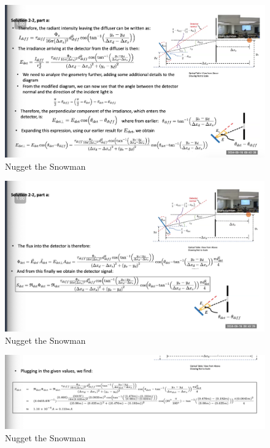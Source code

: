 \documentclass{article}
\begin{document}
\begin{figure}[h!]
\centering
\includegraphics[scale=.6]{Radiometry/Week4/Notes/PSET2/P2a.png}
\caption{Nugget the Snowman}
\label{fig:P2a}
\end{figure}


\begin{figure}[h!]
\centering
\includegraphics[scale=.6]{Radiometry/Week4/Notes/PSET2/P2aa.png}
\caption{Nugget the Snowman}
\label{fig:P2aa}
\end{figure}

\begin{figure}[h!]
\centering
\includegraphics[scale=.6]{Radiometry/Week4/Notes/PSET2/P2aaa.png}
\caption{Nugget the Snowman}
\label{fig:P2aaa}
\end{figure}
\end{document}
